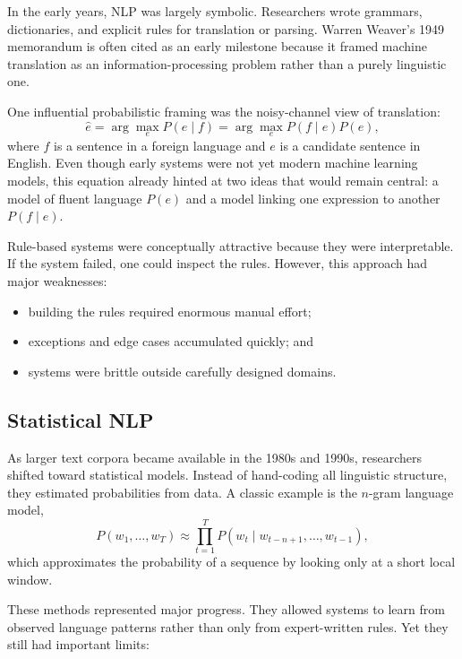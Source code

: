 \documentclass[12pt]{article}
\begin{document}
In the early years, NLP was largely symbolic. Researchers wrote grammars, dictionaries, and explicit rules for translation or parsing. Warren Weaver's 1949 memorandum is often cited as an early milestone because it framed machine translation as an information-processing problem rather than a purely linguistic one.

One influential probabilistic framing was the noisy-channel view of translation:
\begin{equation}
    \hat{e} = \arg\max_e P(e \mid f) = \arg\max_e P(f \mid e)P(e),
    \label{t15eq:noisy_channel}
\end{equation}
where $f$ is a sentence in a foreign language and $e$ is a candidate sentence in English. Even though early systems were not yet modern machine learning models, this equation already hinted at two ideas that would remain central: a model of fluent language $P(e)$ and a model linking one expression to another $P(f\mid e)$.

Rule-based systems were conceptually attractive because they were interpretable. If the system failed, one could inspect the rules. However, this approach had major weaknesses:

\begin{itemize}
    \item building the rules required enormous manual effort;
    \item exceptions and edge cases accumulated quickly; and
    \item systems were brittle outside carefully designed domains.
\end{itemize}

\subsection{Statistical NLP}

As larger text corpora became available in the 1980s and 1990s, researchers shifted toward statistical models. Instead of hand-coding all linguistic structure, they estimated probabilities from data. A classic example is the $n$-gram language model,
\begin{equation}
    P(w_1,\dots,w_T) \approx \prod_{t=1}^T P(w_t \mid w_{t-n+1},\dots,w_{t-1}),
    \label{t15eq:ngram}
\end{equation}
which approximates the probability of a sequence by looking only at a short local window.

These methods represented major progress. They allowed systems to learn from observed language patterns rather than only from expert-written rules. Yet they still had important limits:
\end{document}
